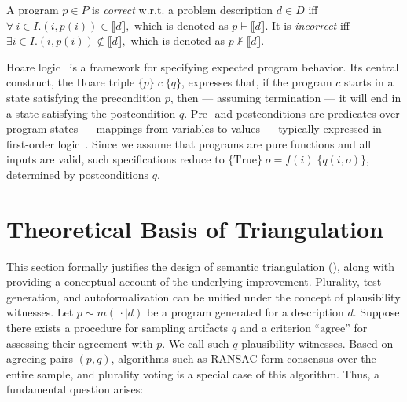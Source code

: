 \documentclass[acmsmall,screen,nonacm]{acmart}
\begin{document}
\begin{definition}\label{def:program_correctness}
  A program $p\in P$ is \emph{correct} w.r.t. a problem description $d\in D$ iff $\forall\ i\in I. (i, p(i)) \in \llbracket d \rrbracket,$ which is denoted as $p \vdash \llbracket d \rrbracket.$ It is \emph{incorrect} iff $\exists i\in I. (i, p(i)) \notin \llbracket d \rrbracket,$ which is denoted as $p \nvdash \llbracket d \rrbracket.$
\end{definition}

Hoare logic~\cite{hoare1969axiomatic} is a framework for specifying expected program behavior. Its central construct, the Hoare triple $\{p\}\;c\;\{q\}$, expresses that, if the program $c$ starts in a state satisfying the precondition $p$, then --- assuming termination --- it will end in a state satisfying the postcondition $q$. Pre- and postconditions are predicates over program states --- mappings from variables to values --- typically expressed in first-order logic~\cite{filliatre2013why3}. Since we assume that programs are pure functions and all inputs are valid, such specifications reduce to $\{\mathrm{True}\}\;o=f(i)\;\{q(i,o)\}$, determined by postconditions $q$.




\section{Theoretical Basis of Triangulation}
\label{sec:theory}

This section formally justifies the design of semantic triangulation (), along with providing a conceptual account of the underlying improvement. Plurality, test generation, and autoformalization can be unified under the concept of plausibility witnesses. Let $p\sim m(\,\cdot\mid d)$ be a program generated for a description $d$. Suppose there exists a procedure for sampling artifacts $q$ and a criterion ``$\mathrm{agree}$'' for assessing their agreement with $p$. We call such $q$ plausibility witnesses. Based on agreeing pairs $(p, q)$, algorithms such as RANSAC form consensus over the entire sample, and plurality voting is a special case of this algorithm. Thus, a fundamental question arises:
\end{document}
